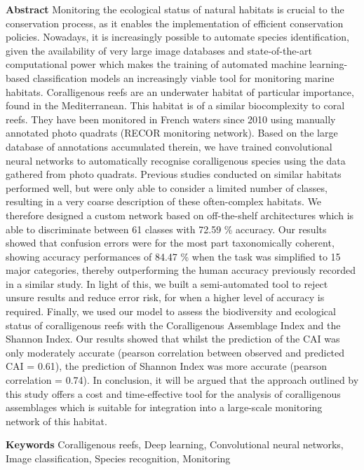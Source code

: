 \medskip

\noindent\textbf{Abstract}
Monitoring the ecological status of natural habitats is crucial to the conservation process, as it enables the implementation of efficient conservation policies. Nowadays, it is increasingly possible to automate species identification, given the availability of very large image databases and state-of-the-art computational power which makes the training of automated machine learning-based classification models an increasingly viable tool for monitoring marine habitats. Coralligenous reefs are an underwater habitat of particular importance, found in the Mediterranean. This habitat is of a similar biocomplexity to coral reefs. They have been monitored in French waters since 2010 using manually annotated photo quadrats (RECOR monitoring network). Based on the large database of annotations accumulated therein, we have trained convolutional neural networks to automatically recognise coralligenous species using the data gathered from photo quadrats. Previous studies conducted on similar habitats performed well, but were only able to consider a limited number of classes, resulting in a very coarse description of these often-complex habitats. We therefore designed a custom network based on off-the-shelf architectures which is able to discriminate between 61 classes with 72.59 \% accuracy. Our results showed that confusion errors were for the most part taxonomically coherent, showing accuracy performances of 84.47 \% when the task was simplified to 15 major categories, thereby outperforming the human accuracy previously recorded in a similar study. In light of this, we built a semi-automated tool to reject unsure results and reduce error risk, for when a higher level of accuracy is required. Finally, we used our model to assess the biodiversity and ecological status of coralligenous reefs with the Coralligenous Assemblage Index and the Shannon Index. Our results showed that whilst the prediction of the CAI was only moderately accurate (pearson correlation between observed and predicted CAI = 0.61), the prediction of Shannon Index was more accurate (pearson correlation = 0.74). In conclusion, it will be argued that the approach outlined by this study offers a cost and time-effective tool for the analysis of coralligenous assemblages which is suitable for integration into a large-scale monitoring network of this habitat.

\medskip

\noindent\textbf{Keywords}
Coralligenous reefs, Deep learning, Convolutional neural networks, Image classification, Species recognition, Monitoring

